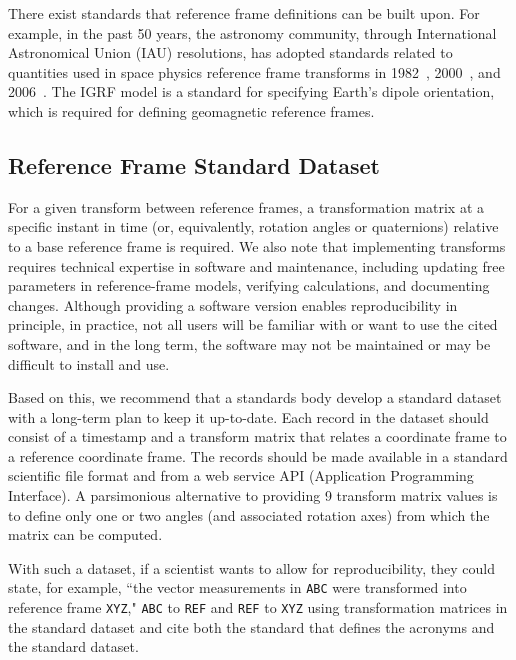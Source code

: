 \documentclass[draft]{agujournal2019}
\begin{document}
There exist standards that reference frame definitions can be built upon. For example, in the past 50 years, the astronomy community, through International Astronomical Union (IAU) resolutions, has adopted standards related to quantities used in space physics reference frame transforms in 1982~\cite{Aoki1982}, 2000~\cite{Capitaine2003}, and 2006~\cite{Capitaine2005}. The IGRF model \cite{IAGA_V-MOD2026} is a standard for specifying Earth's dipole orientation, which is required for defining geomagnetic reference frames.


\subsection{Reference Frame Standard Dataset}
\label{sect:reference-dataset}

For a given transform between reference frames, a transformation matrix at a specific instant in time (or, equivalently, rotation angles or quaternions) relative to a base reference frame is required. We also note that implementing transforms requires technical expertise in software and maintenance, including updating free parameters in reference-frame models, verifying calculations, and documenting changes. Although providing a software version enables reproducibility in principle, in practice, not all users will be familiar with or want to use the cited software, and in the long term, the software may not be maintained or may be difficult to install and use. 

Based on this, we recommend that a standards body develop a standard dataset with a long-term plan to keep it up-to-date. Each record in the dataset should consist of a timestamp and a transform matrix that relates a coordinate frame to a reference coordinate frame. The records should be made available in a standard scientific file format and from a web service API (Application Programming Interface). A parsimonious alternative to providing 9 transform matrix values is to define only one or two angles (and associated rotation axes) from which the matrix can be computed.

With such a dataset, if a scientist wants to allow for reproducibility, they could state, for example, ``the vector measurements in \texttt{ABC} were transformed into reference frame \texttt{XYZ}," \texttt{ABC} to \texttt{REF} and \texttt{REF} to \texttt{XYZ} using transformation matrices in the standard dataset and cite both the standard that defines the acronyms and the standard dataset.
\end{document}
